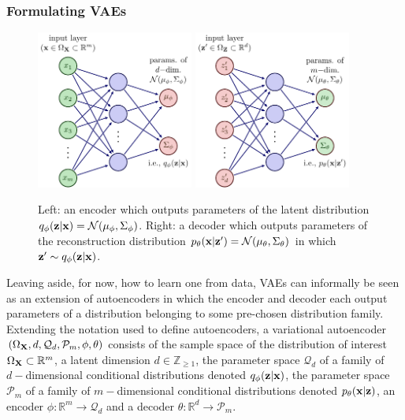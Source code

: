\documentclass[11pt]{article}
\begin{document}
\subsubsection{Formulating VAEs}
\begin{figure}[t]
    \centering %
    \includegraphics[width=0.46\textwidth]{figures/generative_models/VAE_encoder.pdf}
    \hfill
    \includegraphics[width=0.46\textwidth]{figures/generative_models/VAE_decoder.pdf}
    \caption{Left: an encoder which outputs parameters of the latent distribution $q_{\phi}(\mathbf{z}|\mathbf{x})=\mathcal{N}(\mu_{\phi},\Sigma_{\phi})$. Right: a decoder which outputs parameters of the reconstruction distribution $p_{\theta}(\mathbf{x}|\mathbf{z}')=\mathcal{N}(\mu_{\theta},\Sigma_{\theta})$ in which $\mathbf{z}'\sim q_{\phi}(\mathbf{z}|\mathbf{x})$.}
    \label{fig:VAE_architecture}
\end{figure}

Leaving aside, for now, how to learn one from data, VAEs can informally be seen as an extension of autoencoders in which the encoder and decoder each output parameters of a distribution belonging to some pre-chosen distribution family. Extending the notation used to define autoencoders, a variational autoencoder $(\Omega_{\mathbf{X}},d,\mathcal{Q}_d,\mathcal{P}_m,\phi,\theta)$ consists of the sample space of the distribution of interest $\Omega_{\mathbf{X}}\subset\mathbb{R}^m$, a latent dimension $d\in\mathbb{Z}_{\geq1}$, the parameter space $\mathcal{Q}_d$ of a family of $d-$dimensional conditional distributions denoted $q_{\phi}(\mathbf{z}|\mathbf{x})$, the parameter space $\mathcal{P}_m$ of a family of $m-$dimensional conditional distributions denoted $p_{\theta}(\mathbf{x}|\mathbf{z})$, an encoder $\phi:\mathbb{R}^m\to\mathcal{Q}_d$ and a decoder $\theta:\mathbb{R}^d\to\mathcal{P}_m$.
\end{document}
